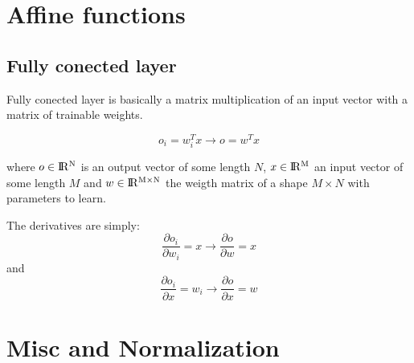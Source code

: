 \documentclass{article}
\begin{document}
\section{Affine functions}

\subsection{Fully conected layer}
Fully conected layer is basically a matrix multiplication of an input vector with a matrix of trainable weights.

\begin{equation}
     \label{25}
o_{i}=w_{i}^T x \rightarrow  o=w^T x
\end{equation}

where $o \in \rm I\!R ^N$ is an output vector of some length $N$, $x \in \rm I\!R ^M $ an input vector of some length $M$ and $w \in \rm I\!R ^{M \times N}$ the weigth matrix of a shape $M \times N$ with parameters to learn.

The derivatives are simply:
\begin{equation}
     \label{25}
\frac{\partial o_i }{\partial w_i} = x  \rightarrow \frac{\partial o }{\partial w} = x
\end{equation}
and
\begin{equation}
     \label{25}
\frac{\partial o_i }{\partial x} = w_i  \rightarrow \frac{\partial o }{\partial x} = w
\end{equation}


\section{Misc and Normalization}
\end{document}
